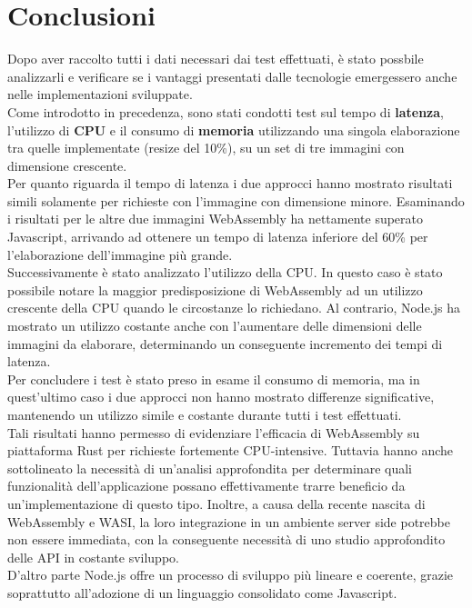 \chapter*{Conclusioni}
\label{Conclusioni}
Dopo aver raccolto tutti i dati necessari dai test effettuati, è stato possbile analizzarli e verificare se i vantaggi presentati dalle tecnologie emergessero anche nelle implementazioni sviluppate.
\\Come introdotto in precedenza, sono stati condotti test sul tempo di \textbf{latenza}, l'utilizzo di \textbf{CPU} e il consumo di \textbf{memoria} utilizzando una singola elaborazione tra quelle implementate (resize del 10\%), su un set di tre immagini con dimensione crescente.
\\Per quanto riguarda il tempo di latenza i due approcci hanno mostrato risultati simili solamente per richieste con l'immagine con dimensione minore. Esaminando i risultati per le altre due immagini WebAssembly ha nettamente superato Javascript, arrivando ad ottenere un tempo di latenza inferiore del 60\% per l'elaborazione dell'immagine più grande.
\\Successivamente è stato analizzato l'utilizzo della CPU. In questo caso è stato possibile notare la maggior predisposizione di WebAssembly ad un utilizzo crescente della CPU quando le circostanze lo richiedano.
Al contrario, Node.js ha mostrato un utilizzo costante anche con l'aumentare delle dimensioni delle immagini da elaborare, determinando un conseguente incremento dei tempi di latenza.
\\Per concludere i test è stato preso in esame il consumo di memoria, ma in quest'ultimo caso i due approcci non hanno mostrato differenze significative, mantenendo un utilizzo simile e costante durante tutti i test effettuati.
\\Tali risultati hanno permesso di evidenziare l'efficacia di WebAssembly su piattaforma Rust per richieste fortemente CPU-intensive.
Tuttavia hanno anche sottolineato la necessità di un'analisi approfondita per determinare quali funzionalità dell’applicazione possano effettivamente trarre beneficio da un’implementazione di questo tipo.
Inoltre, a causa della recente nascita di WebAssembly e WASI, la loro integrazione in un ambiente server side potrebbe non essere immediata, con la conseguente necessità di uno studio approfondito delle API in costante sviluppo.
\\D'altro parte Node.js offre un processo di sviluppo più lineare e coerente, grazie soprattutto all'adozione di un linguaggio consolidato come Javascript.
